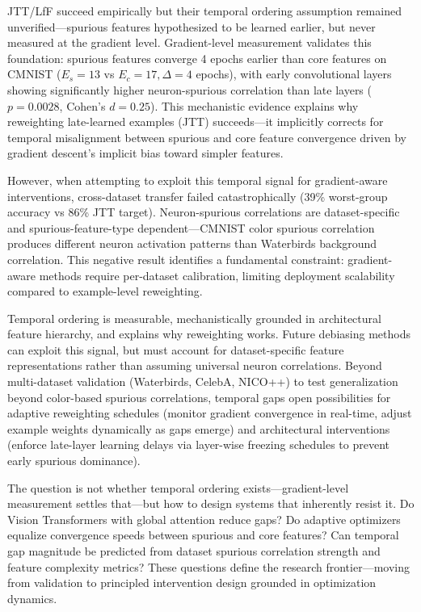 
JTT/LfF succeed empirically but their temporal ordering assumption remained unverified---spurious features hypothesized to be learned earlier, but never measured at the gradient level. Gradient-level measurement validates this foundation: spurious features converge 4 epochs earlier than core features on CMNIST ($E_s=13$ vs $E_c=17, \Delta=4$ epochs), with early convolutional layers showing significantly higher neuron-spurious correlation than late layers ($p=0.0028$, Cohen's $d=0.25$). This mechanistic evidence explains why reweighting late-learned examples (JTT) succeeds---it implicitly corrects for temporal misalignment between spurious and core feature convergence driven by gradient descent's implicit bias toward simpler features.

However, when attempting to exploit this temporal signal for gradient-aware interventions, cross-dataset transfer failed catastrophically (39\% worst-group accuracy vs 86\% JTT target). Neuron-spurious correlations are dataset-specific and spurious-feature-type dependent---CMNIST color spurious correlation produces different neuron activation patterns than Waterbirds background correlation. This negative result identifies a fundamental constraint: gradient-aware methods require per-dataset calibration, limiting deployment scalability compared to example-level reweighting.

Temporal ordering is measurable, mechanistically grounded in architectural feature hierarchy, and explains why reweighting works. Future debiasing methods can exploit this signal, but must account for dataset-specific feature representations rather than assuming universal neuron correlations. Beyond multi-dataset validation (Waterbirds, CelebA, NICO++) to test generalization beyond color-based spurious correlations, temporal gaps open possibilities for adaptive reweighting schedules (monitor gradient convergence in real-time, adjust example weights dynamically as gaps emerge) and architectural interventions (enforce late-layer learning delays via layer-wise freezing schedules to prevent early spurious dominance).

The question is not whether temporal ordering exists---gradient-level measurement settles that---but how to design systems that inherently resist it. Do Vision Transformers with global attention reduce gaps? Do adaptive optimizers equalize convergence speeds between spurious and core features? Can temporal gap magnitude be predicted from dataset spurious correlation strength and feature complexity metrics? These questions define the research frontier---moving from validation to principled intervention design grounded in optimization dynamics.
